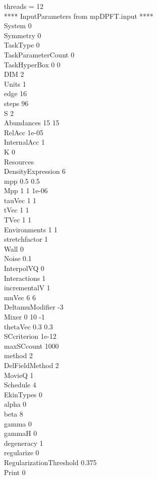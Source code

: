 \documentclass[a4paper,10pt]{article}
\begin{document}
threads = 12\\**** InputParameters from mpDPFT.input ****\\System 0\\Symmetry 0\\TaskType 0\\TaskParameterCount 0\\TaskHyperBox 0 0\\DIM 2\\Units 1\\edge 16\\steps 96\\S 2\\Abundances 15 15\\RelAcc 1e-05\\InternalAcc 1\\K 0\\Resources\\DensityExpression 6\\mpp 0.5 0.5\\Mpp 1 1 1e-06\\tauVec 1 1\\tVec 1 1\\TVec 1 1\\Environments 1 1\\stretchfactor 1\\Wall 0\\Noise 0.1\\InterpolVQ 0\\Interactions 1\\incrementalV 1\\muVec 6 6\\DeltamuModifier -3\\Mixer 0 10 -1\\thetaVec 0.3 0.3\\SCcriterion 1e-12\\maxSCcount 1000\\method 2\\DelFieldMethod 2\\MovieQ 1\\Schedule 4\\EkinTypes 0\\alpha 0\\beta 8\\gamma 0\\gammaH 0\\degeneracy 1\\regularize 0\\RegularizationThreshold 0.375\\Print 0\\\newpage 
\end{document}
